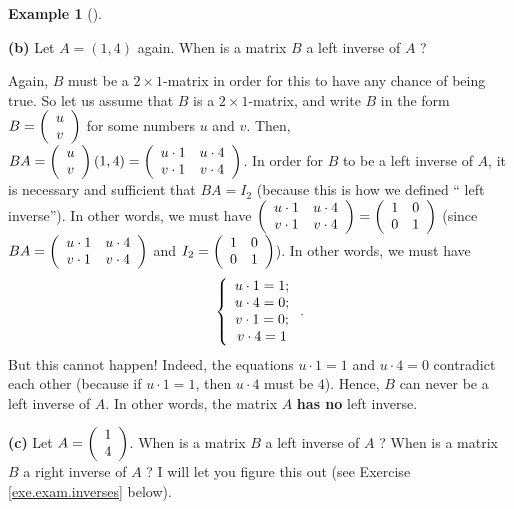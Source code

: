 \documentclass[numbers=enddot,12pt,final,onecolumn,notitlepage]{scrartcl}%
\theoremstyle{definition}
\newtheorem{exam}[theo]{Example}
\newenvironment{example}[1][]
{\begin{exam}[#1]\begin{leftbar}}
{\end{leftbar}\end{exam}}
\begin{document}
\begin{example}
\textbf{(b)} Let $A=\left(  1,4\right)  $ again. When is a matrix $B$ a left
inverse of $A$ ?

Again, $B$ must be a $2\times1$-matrix in order for this to have any chance of
being true. So let us assume that $B$ is a $2\times1$-matrix, and write $B$ in
the form $B=\left(
\begin{array}
[c]{c}%
u\\
v
\end{array}
\right)  $ for some numbers $u$ and $v$. Then, $BA=\left(
\begin{array}
[c]{c}%
u\\
v
\end{array}
\right)  \left(  1,4\right)  =\left(
\begin{array}
[c]{cc}%
u\cdot1 & u\cdot4\\
v\cdot1 & v\cdot4
\end{array}
\right)  $. In order for $B$ to be a left inverse of $A$, it is necessary and
sufficient that $BA=I_{2}$ (because this is how we defined \textquotedblleft
left inverse\textquotedblright). In other words, we must have $\left(
\begin{array}
[c]{cc}%
u\cdot1 & u\cdot4\\
v\cdot1 & v\cdot4
\end{array}
\right)  =\left(
\begin{array}
[c]{cc}%
1 & 0\\
0 & 1
\end{array}
\right)  $ (since $BA=\left(
\begin{array}
[c]{cc}%
u\cdot1 & u\cdot4\\
v\cdot1 & v\cdot4
\end{array}
\right)  $ and $I_{2}=\left(
\begin{array}
[c]{cc}%
1 & 0\\
0 & 1
\end{array}
\right)  $). In other words, we must have%
\[
\left\{
\begin{array}
[c]{c}%
u\cdot1=1;\\
u\cdot4=0;\\
v\cdot1=0;\\
v\cdot4=1
\end{array}
\right.  .
\]
But this cannot happen! Indeed, the equations $u\cdot1=1$ and $u\cdot4=0$
contradict each other (because if $u\cdot1=1$, then $u\cdot4$ must be $4$).
Hence, $B$ can never be a left inverse of $A$. In other words, the matrix $A$
\textbf{has no} left inverse.

\textbf{(c)} Let $A=\left(
\begin{array}
[c]{c}%
1\\
4
\end{array}
\right)  $. When is a matrix $B$ a left inverse of $A$ ? When is a matrix $B$
a right inverse of $A$ ? I will let you figure this out (see Exercise
\ref{exe.exam.inverses} below).


\end{example}
\end{document}

